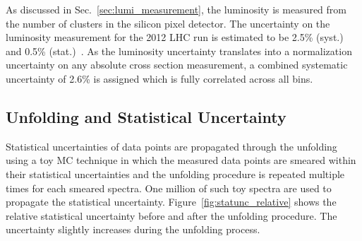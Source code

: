 As discussed in Sec.~\ref{sec:lumi_measurement}, the luminosity is measured from
the number of clusters in the silicon pixel detector. The uncertainty on the
luminosity measurement for the 2012 LHC run is estimated to be 2.5\% (syst.) and
0.5\% (stat.)~\cite{CMS-PAS-LUM-13-001}. As the luminosity uncertainty
translates into a normalization uncertainty on any absolute cross section
measurement, a combined systematic uncertainty of 2.6\% is assigned which is
fully correlated across all bins.

\subsection{Unfolding and Statistical Uncertainty}
\label{sec:stat_unf_uncert}

Statistical uncertainties of data points are propagated through the unfolding
using a toy MC technique in which the measured data points are smeared within
their statistical uncertainties and the unfolding procedure is repeated multiple
times for each smeared spectra. One million of such toy spectra are used to
propagate the statistical uncertainty. Figure~\ref{fig:statunc_relative} shows
the relative statistical uncertainty before and after the unfolding procedure.
The uncertainty slightly increases during the unfolding process.

